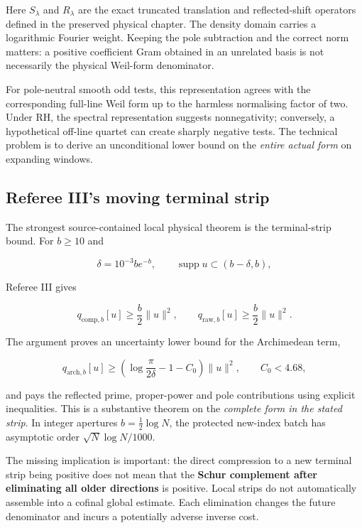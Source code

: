 \documentclass[
  10pt,
  a4paper,
  10pt,
  oneside,
  openany]{book}
\begin{document}
Here \(S_\lambda\) and \(R_\lambda\) are the exact truncated translation
and reflected-shift operators defined in the preserved physical chapter.
The density domain carries a logarithmic Fourier weight. Keeping the
pole subtraction and the correct norm matters: a positive coefficient
Gram obtained in an unrelated basis is not necessarily the physical
Weil-form denominator.

For pole-neutral smooth odd tests, this representation agrees with the
corresponding full-line Weil form up to the harmless normalising factor
of two. Under RH, the spectral representation suggests nonnegativity;
conversely, a hypothetical off-line quartet can create sharply negative
tests. The technical problem is to derive an unconditional lower bound
on the \emph{entire actual form} on expanding windows.

\subsection{Referee III's moving terminal
strip}\label{referee-iiis-moving-terminal-strip}

The strongest source-contained local physical theorem is the
terminal-strip bound. For \(b\ge10\) and

\[
\delta=10^{-3}b e^{-b},\qquad
\operatorname{supp}u\subset (b-\delta,b),
\tag{S5.2}\label{eq:S5.2}
\]

Referee III gives

\[
\boxed{\quad q_{\mathrm{comp},b}[u]\ge \frac b2\|u\|^2,
\qquad q_{\mathrm{raw},b}[u]\ge\frac b2\|u\|^2.\quad}
\tag{S5.3}\label{eq:S5.3}
\]

The argument proves an uncertainty lower bound for the Archimedean term,

\[
q_{\mathrm{arch},b}[u]\ge
\left(\log\frac{\pi}{2\delta}-1-C_0\right)\|u\|^2,
\qquad C_0<4.68,
\tag{S5.4}\label{eq:S5.4}
\]

and pays the reflected prime, proper-power and pole contributions using
explicit inequalities. This is a substantive theorem on the
\emph{complete form in the stated strip}. In integer apertures
\(b=\tfrac12\log N\), the protected new-index batch has asymptotic order
\(\sqrt N\log N/1000\).

The missing implication is important: the direct compression to a new
terminal strip being positive does not mean that the \textbf{Schur
complement after eliminating all older directions} is positive. Local
strips do not automatically assemble into a cofinal global estimate.
Each elimination changes the future denominator and incurs a potentially
adverse inverse cost.
\end{document}
